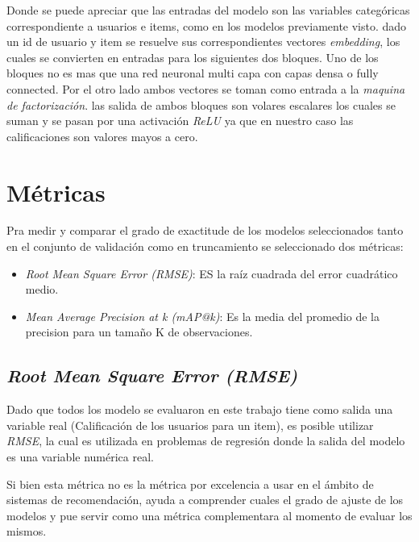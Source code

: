 \documentclass[11pt,a4paper,twoside]{thesis}
\begin{document}
Donde se puede apreciar que las entradas del modelo son las variables categóricas correspondiente a usuarios e items, como en los modelos previamente visto.
dado un id de usuario y item se resuelve sus correspondientes vectores \textit{embedding}, los cuales se convierten en entradas para los siguientes dos bloques. Uno de los bloques no es mas que una red neuronal multi capa con capas densa o fully connected. Por el otro lado ambos vectores se toman como entrada a la \textit{maquina de factorización}. las salida de ambos bloques son volares escalares los cuales se suman y se pasan por una activación \textit{ReLU} ya que en nuestro caso las calificaciones son valores mayos a cero.


\section{Métricas}

Pra medir y comparar el grado de exactitude de los modelos seleccionados tanto en el conjunto de validación como en truncamiento se seleccionado dos métricas:

\begin{itemize}
	\item \textit{Root Mean Square Error (RMSE)}: ES la raíz cuadrada del error cuadrático medio.
	\item \textit{Mean Average Precision at k (mAP@k)}: Es la media del promedio de la precision  para un tamaño K de observaciones.
\end{itemize}

\subsection{\textit{Root Mean Square Error (RMSE)}}

Dado que todos los modelo se evaluaron en este trabajo tiene como salida una variable real (Calificación de los usuarios para un item), es posible utilizar \textit{RMSE}, la cual es  
utilizada en problemas de regresión donde la salida del modelo es una variable numérica real.

Si bien esta métrica no es la métrica por excelencia a usar en el ámbito de sistemas de recomendación, ayuda a comprender cuales el grado de ajuste de los modelos y pue servir como una métrica complementara al momento de evaluar los mismos.
\end{document}
